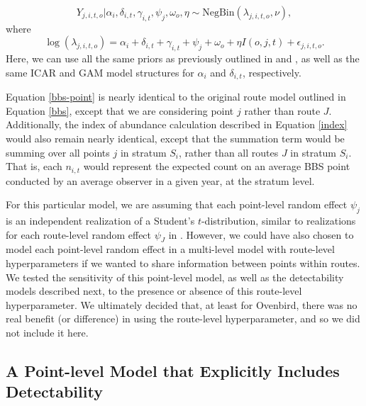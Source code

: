 \begin{equation*}
	Y_{j,i,t,o} | \alpha_i, \delta_{i,t}, \gamma_{i,t}, \psi_j, \omega_o, \eta \sim \text{NegBin}(\lambda_{j,i,t,o}, \nu),
\end{equation*}
where
\begin{equation}\label{bbs-point}
	\log(\lambda_{j,i,t,o}) = \alpha_i + \delta_{i,t} + \gamma_{i,t} + \psi_j + \omega_o + \eta I(o,j,t) + \epsilon_{j,i,t,o}.
\end{equation}
Here, we can use all the same priors as previously outlined in \citet{smith_north_2021} and \citet{smith_spatially_2023}, as well as the same ICAR and GAM model structures for $\alpha_i$ and $\delta_{i,t}$, respectively.

\par Equation \ref{bbs-point} is nearly identical to the original route model outlined in Equation \ref{bbs}, except that we are considering point $j$ rather than route $J$.
Additionally, the index of abundance calculation described in Equation \ref{index} would also remain nearly identical, except that the summation term would be summing over all points $j$ in stratum $S_i$, rather than all routes $J$ in stratum $S_i$. 
That is, each $n_{i,t}$ would represent the expected count on an average BBS point conducted by an average observer in a given year, at the stratum level.

\par For this particular model, we are assuming that each point-level random effect $\psi_j$ is an independent realization of a Student's $t$-distribution, similar to realizations for each route-level random effect $\psi_J$ in \citet{smith_north_2021, smith_spatially_2023}.
However, we could have also chosen to model each point-level random effect in a multi-level model with route-level hyperparameters if we wanted to share information between points within routes.
We tested the sensitivity of this point-level model, as well as the detectability models described next, to the presence or absence of this route-level hyperparameter.
We ultimately decided that, at least for Ovenbird, there was no real benefit (or difference) in using the route-level hyperparameter, and so we did not include it here.

\subsection{A Point-level Model that Explicitly Includes Detectability}\label{detect-text}

